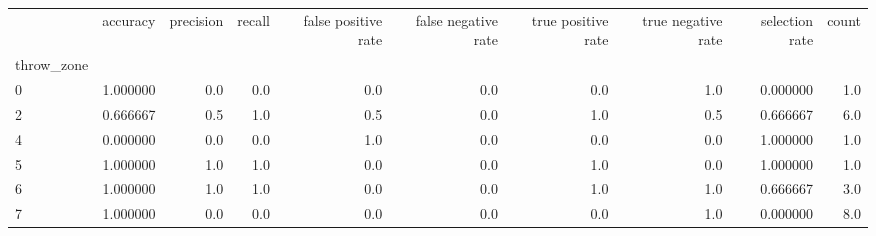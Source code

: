 \begin{tabular}{lrrrrrrrrr}
\toprule
{} &  accuracy &  precision &  recall &  false positive rate &  false negative rate &  true positive rate &  true negative rate &  selection rate &  count \\
throw\_zone &           &            &         &                      &                      &                     &                     &                 &        \\
\midrule
0          &  1.000000 &        0.0 &     0.0 &                  0.0 &                  0.0 &                 0.0 &                 1.0 &        0.000000 &    1.0 \\
2          &  0.666667 &        0.5 &     1.0 &                  0.5 &                  0.0 &                 1.0 &                 0.5 &        0.666667 &    6.0 \\
4          &  0.000000 &        0.0 &     0.0 &                  1.0 &                  0.0 &                 0.0 &                 0.0 &        1.000000 &    1.0 \\
5          &  1.000000 &        1.0 &     1.0 &                  0.0 &                  0.0 &                 1.0 &                 0.0 &        1.000000 &    1.0 \\
6          &  1.000000 &        1.0 &     1.0 &                  0.0 &                  0.0 &                 1.0 &                 1.0 &        0.666667 &    3.0 \\
7          &  1.000000 &        0.0 &     0.0 &                  0.0 &                  0.0 &                 0.0 &                 1.0 &        0.000000 &    8.0 \\
\bottomrule
\end{tabular}
